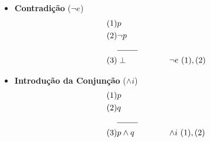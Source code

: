 \documentclass[11pt,a4paper,oneside]{article}
\begin{document}
\begin{multicols}{2}
\begin{itemize}
	\item {\bf Contradição} ($\neg e$)
			\begin{eqnarray*}
				(1) & p & \\
				(2) & \neg p & \\
				 & \line(1,0){25} & \\
				(3) & \perp & \hspace{1cm} \neg e \mbox{ } (1),(2)
			\end{eqnarray*}
\end{itemize}
\end{multicols}


\begin{itemize}	
	\item {\bf Introdução da Conjunção} ($\wedge i$)
			\begin{eqnarray*}
				(1) & p & \\
				(2) & q & \\
				 & \line(1,0){25} & \\
				(3) & p \wedge q & \hspace{1cm} \wedge i \mbox{ } (1),(2)
			\end{eqnarray*}
\end{itemize}
\end{document}

